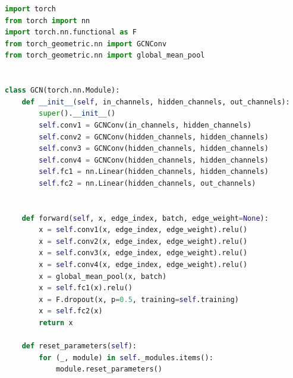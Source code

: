 \documentclass{article}
\begin{document}
\begin{lstlisting}[language=Python]
import torch
from torch import nn
import torch.nn.functional as F
from torch_geometric.nn import GCNConv
from torch_geometric.nn import global_mean_pool


class GCN(torch.nn.Module):
    def __init__(self, in_channels, hidden_channels, out_channels):
        super().__init__()
        self.conv1 = GCNConv(in_channels, hidden_channels)
        self.conv2 = GCNConv(hidden_channels, hidden_channels)
        self.conv3 = GCNConv(hidden_channels, hidden_channels)
        self.conv4 = GCNConv(hidden_channels, hidden_channels)
        self.fc1 = nn.Linear(hidden_channels, hidden_channels)
        self.fc2 = nn.Linear(hidden_channels, out_channels)


    def forward(self, x, edge_index, batch, edge_weight=None):
        x = self.conv1(x, edge_index, edge_weight).relu()
        x = self.conv2(x, edge_index, edge_weight).relu()
        x = self.conv3(x, edge_index, edge_weight).relu()
        x = self.conv4(x, edge_index, edge_weight).relu()
        x = global_mean_pool(x, batch)
        x = self.fc1(x).relu()
        x = F.dropout(x, p=0.5, training=self.training)
        x = self.fc2(x)
        return x
    
    def reset_parameters(self):
        for (_, module) in self._modules.items():
            module.reset_parameters()

\end{lstlisting}
\end{document}
